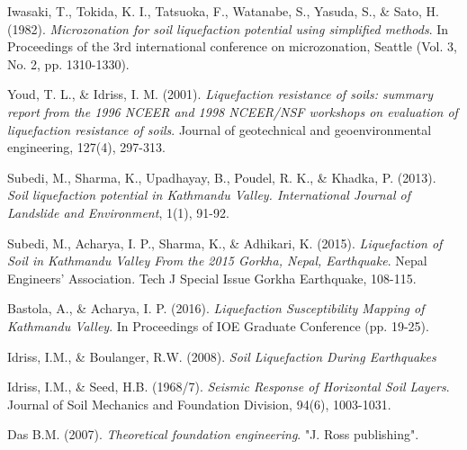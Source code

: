 \begin{thebibliography}{99}
Iwasaki, T., Tokida, K. I., Tatsuoka, F., Watanabe, S., Yasuda, S., \& Sato, H. (1982). \emph{Microzonation for soil liquefaction potential using simplified methods}. In Proceedings of the 3rd international conference on microzonation, Seattle (Vol. 3, No. 2, pp. 1310-1330).

Youd, T. L., \& Idriss, I. M. (2001). \emph{Liquefaction resistance of soils: summary report from the 1996 NCEER and 1998 NCEER/NSF workshops on evaluation of liquefaction resistance of soils}. Journal of geotechnical and geoenvironmental engineering, 127(4), 297-313.

Subedi, M., Sharma, K., Upadhayay, B., Poudel, R. K., \& Khadka, P. (2013). \emph{Soil liquefaction potential in Kathmandu Valley. International Journal of Landslide and Environment}, 1(1), 91-92.

Subedi, M., Acharya, I. P., Sharma, K., \& Adhikari, K. (2015). \emph{Liquefaction of Soil in Kathmandu Valley From the 2015 Gorkha, Nepal, Earthquake}. Nepal Engineers’ Association. Tech J Special Issue Gorkha Earthquake, 108-115.

Bastola, A., \& Acharya, I. P. (2016). \emph{Liquefaction Susceptibility Mapping of Kathmandu Valley}. In Proceedings of IOE Graduate Conference (pp. 19-25).

Idriss, I.M., \& Boulanger, R.W. (2008). \emph{Soil Liquefaction During Earthquakes}

Idriss, I.M., \& Seed, H.B. (1968/7). \emph{Seismic Response of Horizontal Soil Layers}. Journal of Soil Mechanics and Foundation Division, 94(6), 1003-1031.

Das B.M. (2007). \emph{Theoretical foundation engineering}. "J. Ross publishing".

\end{thebibliography}